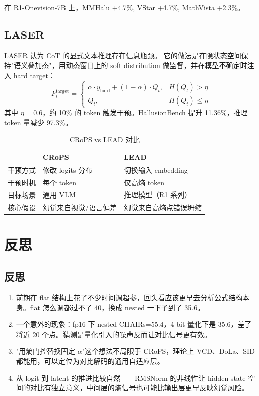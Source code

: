 \documentclass[12pt,a4paper]{ctexart}
\begin{document}
在 R1-Onevision-7B 上，MMHalu $+$4.7\%, VStar $+$4.7\%, MathVista $+$2.3\%。

\subsection{LASER}

LASER 认为 CoT 的显式文本推理存在信息瓶颈。
它的做法是在隐状态空间保持"语义叠加态"，用动态窗口上的 soft distribution 做监督，并在模型不确定时注入 hard target：
\begin{equation}
P_t^{\text{target}} = \begin{cases}
\alpha \cdot y_{\text{hard}} + (1-\alpha) \cdot Q_t, & H(Q_t) > \eta \\
Q_t, & H(Q_t) \leq \eta
\end{cases}
\end{equation}
其中 $\eta=0.6$，约 10\% 的 token 触发干预。HallusionBench 提升 11.36\%，推理 token 量减少 97.3\%。


\begin{table}[H]
\centering
\caption{CRoPS vs LEAD 对比}
\label{tab:lead_vs_crops}
\begin{tabular}{lll}
\toprule
 & \textbf{CRoPS} & \textbf{LEAD} \\
\midrule
干预方式 & 修改 logits 分布 & 切换输入 embedding \\
干预时机 & 每个 token & 仅高熵 token \\
目标场景 & 通用 VLM & 推理模型（R1 系列） \\
核心假设 & 幻觉来自视觉/语言偏差 & 幻觉来自高熵点错误坍缩 \\
\bottomrule
\end{tabular}
\end{table}


\section{反思}

\subsection{反思}

\begin{enumerate}[leftmargin=2em]
\item 前期在 flat 结构上花了不少时间调超参，回头看应该更早去分析公式结构本身。flat 怎么调都过不了 40，换成 nested 一下子到了 35.6。
\item 一个意外的现象：fp16 下 nested CHAIRs=55.4，4-bit 量化下是 35.6，差了将近 20 个点。猜测是量化引入的噪声反而让对比信号更有效。
\item "用熵门控替换固定 $\alpha$"这个想法不局限于 CRoPS，理论上 VCD、DoLa、SID 都能用，可以定位为对比解码的通用自适应层。
\item 从 logit 到 latent 的推进比较自然——RMSNorm 的非线性让 hidden state 空间的对比有独立意义，中间层的熵信号也可能比输出层更早反映幻觉风险。
\end{enumerate}
\end{document}
